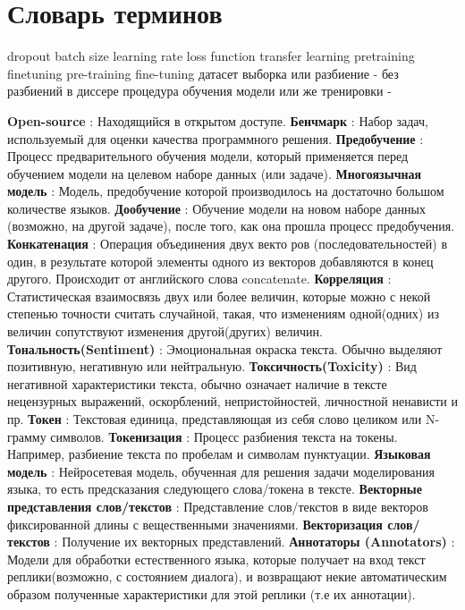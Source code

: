 \chapter*{Словарь терминов}             %
dropout batch size learning rate loss function transfer learning
pretraining finetuning pre-training fine-tuning датасет
выборка или разбиение - без разбиений в диссере процедура обучения модели или же тренировки - 
\textbf{Open-source} : Находящийся в открытом доступе. 
\textbf{Бенчмарк} : Набор задач, используемый для оценки качества программного решения. 
\textbf{Предобучение} : Процесс предварительного обучения модели, который
применяется перед обучением модели на целевом наборе данных (или задаче). 
\textbf{Многоязычная модель} : Модель, предобучение которой производилось на достаточно большом количестве языков. 
\textbf{Дообучение} : Обучение модели на новом наборе данных (возможно, на другой задаче), после того, как она прошла процесс предобучения.
\textbf{Конкатенация} : Операция объединения двух векто
ров (последовательностей) в один, в результате которой элементы одного из векторов добавляются в конец другого. Происходит от английского слова concatenate. 
\textbf{Корреляция} : Статистическая взаимосвязь двух или более величин, которые можно с некой степенью точности считать случайной, такая, что изменениям одной(одних) из величин сопутствуют изменения другой(других) величин. 
\textbf{Тональность(Sentiment)} : Эмоциональная окраска текста. Обычно выделяют позитивную, негативную или нейтральную.
\textbf{Токсичность(Toxicity)} : Вид негативной характеристики текста, обычно означает наличие в тексте нецензурных выражений, оскорблений, непристойностей, личностной ненависти и пр.
\textbf{Токен} : Текстовая единица, представляющая из себя слово целиком или N-грамму символов.
\textbf{Токенизация} : Процесс разбиения текста на токены. Например, разбиение текста по пробелам и символам пунктуации. 
\textbf{Языковая модель} : Нейросетевая модель, обученная для решения задачи моделирования языка, то есть предсказания следующего слова/токена в тексте.
\textbf{Векторные представления слов/текстов} : Представление слов/текстов в виде векторов фиксированной длины с вещественными
значениями.  
\textbf{Векторизация слов/текстов} : Получение их векторных представлений. 
\textbf{Аннотаторы (Annotators)} : Модели для обработки естественного языка, которые получает на вход текст реплики(возможно, с состоянием диалога), и возвращают некие автоматическим образом полученные характеристики для этой реплики (т.е их аннотации). 
